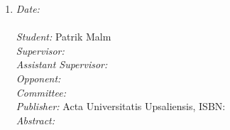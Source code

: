 {\begin{enumerate}
We propose two different types of adaptive structuring elements from the salience map of the edge strength: (i) the shape of a structuring element is predefined, and its size is determined from the salience map; (ii) the shape and size of a structuring element are dependent on the salience map. Using this salience map, we also define adaptive structuring functions. We also present the applicability of adaptive mathematical morphology to image regularization. The connection between adaptive mathematical morphology and Lasry-Lions regularization of non-smooth functions provides an elegant tool for image regularization.

\item
{\em Date:} ~\\
{\bf }~\\
{\em Student:} Patrik Malm~\\
{\em Supervisor:} ~\\
{\em Assistant Supervisor:} ~\\
{\em Opponent:} ~\\
{\em Committee:}  ~\\
{\em Publisher:} Acta Universitatis Upsaliensis, ISBN: ~\\ 
{\em Abstract:}




\end{enumerate}
}